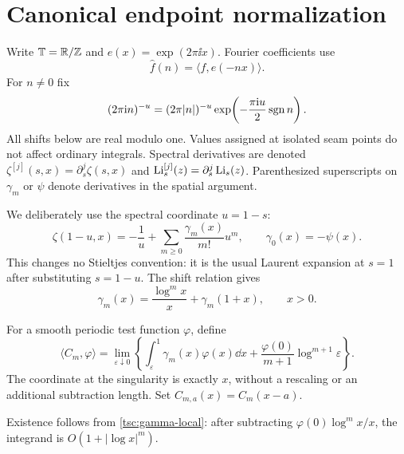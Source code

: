 \section{Canonical endpoint normalization}\label{tsc:normalization}
Write $\mathbb T=\mathbb R/\mathbb Z$ and $e(x)=\exp(2\pi\ii x)$. Fourier coefficients use
\[
 \widehat f(n)=\langle f,e(-nx)\rangle.
\]
For $n\ne0$ fix
\begin{equation}\label{tsc:branch}
 (2\pi\mathrm i n)^{-u}=(2\pi|n|)^{-u}
       \exp\!\left(-\frac{\pi\mathrm i u}{2}\operatorname{sgn} n\right).
\end{equation}
All shifts below are real modulo one. Values assigned at isolated seam
points do not affect ordinary integrals. Spectral derivatives are denoted
$\zeta^{[j]}(s,x)=\partial_s^j\zeta(s,x)$ and
$\operatorname{Li}_s^{[j]}(z)=\partial_s^j\operatorname{Li}_s(z)$. Parenthesized superscripts on
$\gamma_m$ or $\psi$ denote derivatives in the spatial argument.

We deliberately use the spectral coordinate $u=1-s$:
\begin{equation}\label{tsc:stieltjes-convention}
 \zeta(1-u,x)=-\frac1u+
     \sum_{m\ge0}\frac{\gamma_m(x)}{m!}u^m,
 \qquad \gamma_0(x)=-\psi(x).
\end{equation}
This changes no Stieltjes convention: it is the usual Laurent expansion
at $s=1$ after substituting $s=1-u$. The shift relation gives
\begin{equation}\label{tsc:gamma-local}
 \gamma_m(x)=\frac{\log^m x}{x}+\gamma_m(1+x),\qquad x>0.
\end{equation}

\begin{definition}\label{tsc:Cdef}
For a smooth periodic test function $\varphi$, define
\begin{equation}\label{tsc:Cfp}
 \langle C_m,\varphi\rangle=
 \lim_{\varepsilon\downarrow0}\left\{
   \int_{\varepsilon}^{1}\gamma_m(x)\varphi(x)\dd x
    +\frac{\varphi(0)}{m+1}\log^{m+1}\varepsilon\right\}.
\end{equation}
The coordinate at the singularity is exactly $x$, without a rescaling or
an additional subtraction length. Set $C_{m,a}(x)=C_m(x-a)$.
\end{definition}
Existence follows from \eqref{tsc:gamma-local}: after subtracting
$\varphi(0)\log^m x/x$, the integrand is $O(1+|\log x|^m)$.

